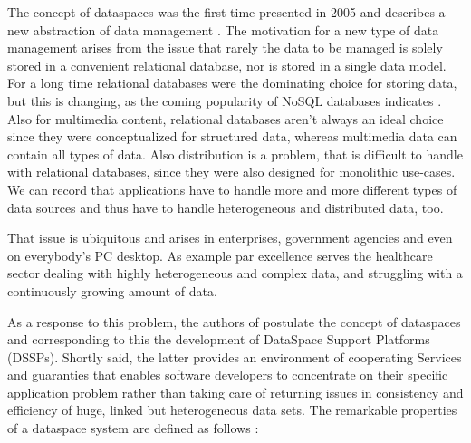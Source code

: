The concept of dataspaces was the first time presented in 2005 and describes a new abstraction of data management \cite[p. 27]{Franklin:2005:DDN:1107499.1107502}. 
The motivation for a new type of data management arises from the issue that rarely the data to be managed is solely stored in a convenient relational database, nor is stored in a single data model.
For a long time relational databases were the dominating choice for storing data, but this is changing, as the coming popularity of NoSQL databases indicates \cite{SQL_NOSQL_DATABASES}. Also for multimedia content, relational databases aren't always an ideal choice since they were conceptualized for structured data, whereas multimedia data can contain all types of data. Also distribution is a problem, that is difficult to handle with relational databases, since they were also designed for monolithic use-cases.
We can record that applications have to handle more and more different types of data sources and thus have to handle heterogeneous and distributed data, too.

That issue is ubiquitous and arises in enterprises, government agencies and even on everybody's PC desktop. As example par excellence serves the healthcare sector dealing with highly heterogeneous and complex data, and struggling with a continuously growing amount of data.

As a response to this problem, the authors of \cite{Franklin:2005:DDN:1107499.1107502} postulate the concept of dataspaces and corresponding to this the  development of DataSpace Support Platforms (DSSPs). Shortly said, the latter provides an environment of cooperating Services and guaranties that enables software developers to concentrate on their specific application problem rather than taking care of returning issues in consistency and efficiency of huge, linked but heterogeneous data sets. The remarkable properties of a dataspace system are defined as follows \cite[p. 28]{Franklin:2005:DDN:1107499.1107502}:

